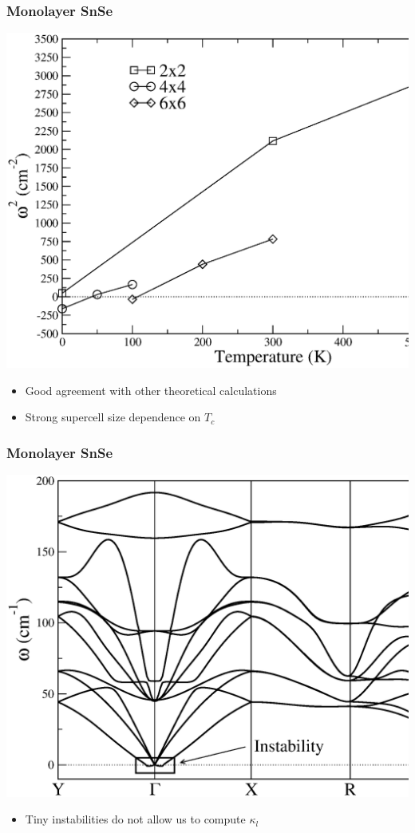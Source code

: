 \documentclass{beamer}
\begin{document}

\begin{frame}

\frametitle{Monolayer SnSe}
\begin{center}
 \includegraphics[width=0.75\linewidth]{Pictures/MonoSnSe/freq-mono.eps}
\end{center}
\begin{itemize}
 \item Good agreement with other theoretical calculations
 \item Strong supercell size dependence on $T_{c}$
\end{itemize}

\end{frame}


\begin{frame}

\frametitle{Monolayer SnSe}
\vspace{0.5cm}
\begin{center}
 \includegraphics[width=0.8\linewidth]{Pictures/MonoSnSe/sscha-mono.eps}
\end{center}
\begin{itemize}
 \item Tiny instabilities do not allow us to compute $\kappa_{l}$
\end{itemize}

\end{frame}
\end{document}
